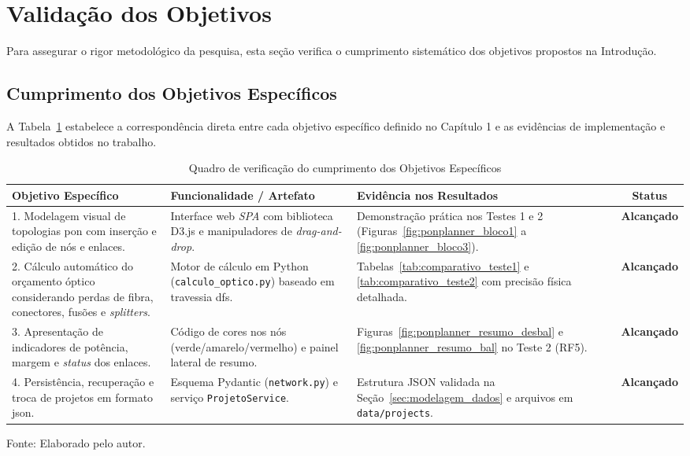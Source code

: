 \section{Validação dos Objetivos}
\label{sec:validacao_objetivos}

Para assegurar o rigor metodológico da pesquisa, esta seção verifica o cumprimento sistemático dos objetivos propostos na Introdução.

\subsection{Cumprimento dos Objetivos Específicos}

A Tabela~\ref{tab:validacao_objetivos_especificos} estabelece a correspondência direta entre cada objetivo específico definido no Capítulo 1 e as evidências de implementação e resultados obtidos no trabalho.

\begin{table}[htb]
\centering
\caption{Quadro de verificação do cumprimento dos Objetivos Específicos}
\label{tab:validacao_objetivos_especificos}
\small
\begin{tabularx}{\textwidth}{|p{3.2cm}|p{4.6cm}|X|c|}
\hline
\textbf{Objetivo Específico} & \textbf{Funcionalidade / Artefato} & \textbf{Evidência nos Resultados} & \textbf{Status} \\
\hline
1. Modelagem visual de topologias \gls{pon} com inserção e edição de nós e enlaces. & Interface web \textit{SPA} com biblioteca D3.js e manipuladores de \textit{drag-and-drop}. & Demonstração prática nos Testes 1 e 2 (Figuras~\ref{fig:ponplanner_bloco1} a \ref{fig:ponplanner_bloco3}). & \textbf{Alcançado} \\
\hline
2. Cálculo automático do orçamento óptico considerando perdas de fibra, conectores, fusões e \textit{splitters}. & Motor de cálculo em Python (\texttt{calculo\_optico.py}) baseado em travessia \gls{dfs}. & Tabelas~\ref{tab:comparativo_teste1} e \ref{tab:comparativo_teste2} com precisão física detalhada. & \textbf{Alcançado} \\
\hline
3. Apresentação de indicadores de potência, margem e \textit{status} dos enlaces. & Código de cores nos nós (verde/amarelo/vermelho) e painel lateral de resumo. & Figuras~\ref{fig:ponplanner_resumo_desbal} e \ref{fig:ponplanner_resumo_bal} no Teste 2 (RF5). & \textbf{Alcançado} \\
\hline
4. Persistência, recuperação e troca de projetos em formato \gls{json}. & Esquema Pydantic (\texttt{network.py}) e serviço \texttt{ProjetoService}. & Estrutura JSON validada na Seção~\ref{sec:modelagem_dados} e arquivos em \texttt{data/projects}. & \textbf{Alcançado} \\
\hline
\end{tabularx}
\par\footnotesize Fonte: Elaborado pelo autor.
\end{table}

